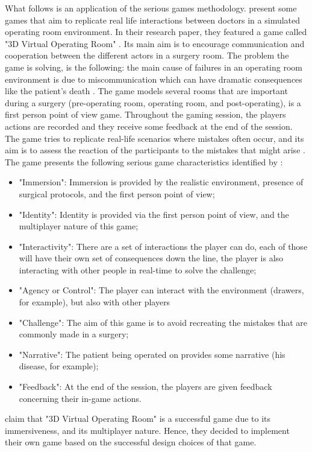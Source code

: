 \documentclass{l4proj}
\begin{document}
What follows is an application of the serious games methodology. \citet{panzoli_interaction_2017} present some games that aim to replicate real life interactions between doctors
in a simulated operating room environment. In their research paper, they featured a game called "3D Virtual Operating Room" \citep{panzoli_interaction_2017}.
Its main aim is to encourage communication and cooperation between the different actors in a surgery room.
The problem the game is solving, is the following: the main cause of failures in an operating room environment is due to miscommunication 
which can have dramatic consequences like the patient's death \citep{panzoli_interaction_2017}. 
The game models several rooms that are important during a surgery (pre-operating room, operating room, and post-operating), 
is a first person point of view game.
Throughout the gaming session, the players actions are recorded and they receive some feedback at the end of the session.
The game tries to replicate real-life scenarios where mistakes often occur, 
and its aim is to assess the reaction of the participants to the mistakes that might arise \citep{panzoli_interaction_2017}.
The game presents the following serious game characteristics identified by \citet{blumberg_serious_2012}:
\begin{itemize}
    \item "Immersion": Immersion is provided by the realistic environment, presence of surgical protocols, and the first person point of view;
    \item "Identity": Identity is provided via the first person point of view, and the multiplayer nature of this game;
    \item "Interactivity": There are a set of interactions the player can do, each of those will have their own set of consequences down the line, 
    the player is also interacting with other people in real-time to solve the challenge;
    \item "Agency or Control": The player can interact with the environment (drawers, for example), but also with other players
    \item "Challenge": The aim of this game is to avoid recreating the mistakes that are commonly made in a surgery;
    \item "Narrative": The patient being operated on provides some narrative (his disease, for example);
    \item "Feedback": At the end of the session, the players are given feedback concerning their in-game actions.
\end{itemize}
\citet{panzoli_interaction_2017} claim that "3D Virtual Operating Room" is a successful game due to its immersiveness, and its multiplayer nature.
Hence, they decided to implement their own game based on the successful design choices of that game.  
\end{document}
